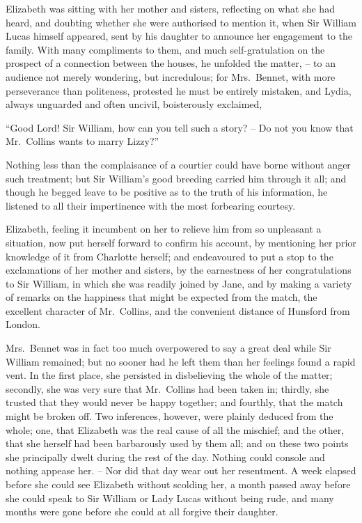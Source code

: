 
Elizabeth was sitting with her mother and sisters,
reflecting on what she had heard, and doubting whether
she were authorised to mention it, when Sir William Lucas
himself appeared, sent by his daughter to announce her
engagement to the family. With many compliments to
them, and much self-gratulation on the prospect of a
connection between the houses, he unfolded the matter, -- to
an audience not merely wondering, but incredulous;
for Mrs.\ Bennet, with more perseverance than politeness,
protested he must be entirely mistaken, and Lydia, always
unguarded and often uncivil, boisterously exclaimed,

“Good Lord! Sir William, how can you tell such
a story? -- Do not you know that Mr.\ Collins wants to
marry Lizzy?”

Nothing less than the complaisance of a courtier could
have borne without anger such treatment; but Sir
William’s good breeding carried him through it all; and
though he begged leave to be positive as to the truth
of his information, he listened to all their impertinence
with the most forbearing courtesy.

Elizabeth, feeling it incumbent on her to relieve him
from so unpleasant a situation, now put herself forward
to confirm his account, by mentioning her prior knowledge
of it from Charlotte herself; and endeavoured to put
a stop to the exclamations of her mother and sisters, by
the earnestness of her congratulations to Sir William,
in which she was readily joined by Jane, and by making
a variety of remarks on the happiness that might be
expected from the match, the excellent character of
Mr.\ Collins, and the convenient distance of Hunsford from
London.

Mrs.\ Bennet was in fact too much overpowered to
say a great deal while Sir William remained; but no
sooner had he left them than her feelings found a rapid
vent. In the first place, she persisted in disbelieving the
whole of the matter; secondly, she was very sure that
Mr.\ Collins had been taken in; thirdly, she trusted that
they would never be happy together; and fourthly, that
the match might be broken off. Two inferences, however,
were plainly deduced from the whole; one, that Elizabeth
was the real cause of all the mischief; and the other, that
she herself had been barbarously used by them all; and
on these two points she principally dwelt during the rest
of the day. Nothing could console and nothing appease
her. -- Nor did that day wear out her resentment. A week
elapsed before she could see Elizabeth without scolding
her, a month passed away before she could speak to
Sir William or Lady Lucas without being rude, and many
months were gone before she could at all forgive their
daughter.

